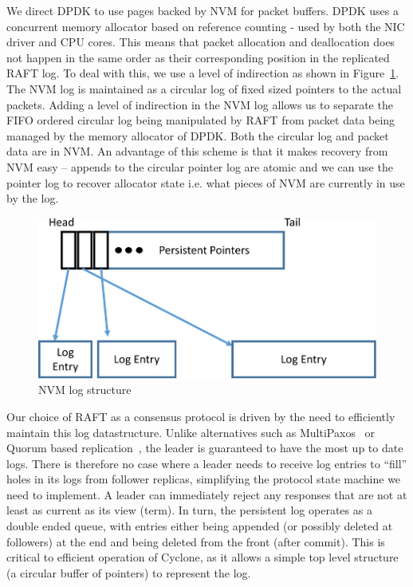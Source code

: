 \documentclass[pageno]{jpaper}
\begin{document}
We direct DPDK to use pages backed by NVM for packet buffers. DPDK uses a
concurrent memory allocator based on reference counting - used by both the NIC
driver and CPU cores. This means that packet allocation and deallocation does
not happen in the same order as their corresponding position in the replicated
RAFT log. To deal with this, we use a level of indirection as shown in
Figure~\ref{fig:nvm_log}. The NVM log is maintained as a circular log of fixed
sized pointers to the actual packets. Adding a level of indirection in the NVM
log allows us to separate the FIFO ordered circular log being manipulated by
RAFT from packet data being managed by the memory allocator of DPDK. Both the
circular log and packet data are in NVM. An advantage of this scheme is that it
makes recovery from NVM easy -- appends to the circular pointer log are atomic
and we can use the pointer log to recover allocator state i.e. what pieces of
NVM are currently in use by the log.

\begin{figure}
\centering
\includegraphics[scale=0.3]{figures2/nvm_log.pdf}
\caption{NVM log structure}
\label{fig:nvm_log}
\end{figure}

Our choice of RAFT as a consensus protocol is driven by the need to efficiently
maintain this log datastructure. Unlike alternatives such as
MultiPaxos~\cite{multipaxos} or Quorum based replication~\cite{quorum}, the
leader is guaranteed to have the most up to date logs. There is therefore no
case where a leader needs to receive log entries to ``fill'' holes in its logs
from follower replicas, simplifying the protocol state machine we need to
implement. A leader can immediately reject any responses that are not at least as
current as its view (term). In turn, the persistent log operates as a double
ended queue, with entries either being appended (or possibly deleted at
followers) at the end and being deleted from the front (after commit). This is
critical to efficient operation of Cyclone, as it allows a simple top level
structure (a circular buffer of pointers) to represent the log.
\end{document}
